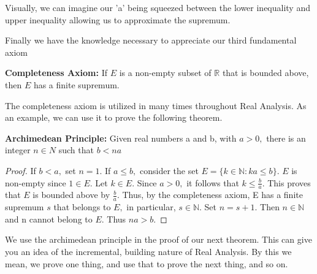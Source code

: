 Visually, we can imagine our 'a' being squeezed between the lower inequality and upper inequality allowing us to approximate the supremum.

Finally we have the knowledge necessary to appreciate our third fundamental axiom

\begin{definition} \textbf{Completeness Axiom:}\newline
If $E$ is a non-empty subset of $\mathbb{R}$ that is bounded above, then $E$ has a finite supremum.
\end{definition}

The completeness axiom is utilized in many times throughout Real Analysis. As an example, we can use it to prove the following theorem.

\begin{theorem} \textbf{Archimedean Principle:}\newline
Given real numbers a and b, with $a > 0,$ there is an integer $n \in N$ such that $b < na$
\end{theorem}

\begin{proof}
If $b <a,$ set $n=1.$ If $a \leq b,$ consider the set $E=\{k\in \mathbb{N}: ka \leq b\}.$ $E$ is non-empty since $1 \in E.$ Let $k \in E.$ Since $a > 0,$ it follows that $k \leq \frac{b}{a}.$ This proves that $E$ is bounded above by $\frac{b}{a}.$ Thus, by the completeness axiom, E has a finite supremum $s$ that belongs to $E,$ in particular, $s \in \mathbb{N}.$\newline
Set $n=s+1.$ Then $n \in \mathbb{N}$ and n cannot belong to $E.$ Thus $na > b.$
\end{proof}

We use the archimedean principle in the proof of our next theorem. This can give you an idea of the incremental, building nature of Real Analysis. By this we mean, we prove one thing, and use that to prove the next thing, and so on.

